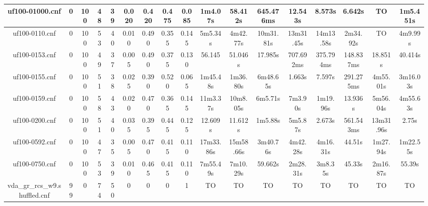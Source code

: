 \documentclass{article}
\begin{document}
\begin{table}[ht!]
\begin{tabular}{|c||c|c|c|c|c|c|c|c||c|c|c|c|c|c|c|c|}
uf100-01000.cnf & 0 & 100 & 48 & 39 & 0.020 & 0.420 & 0.475 & 0.085 & 1m4.07s &
58.412s & 645.476ms & 12.543s & 8.573s & 6.642s & TO & 1m5.451s \\\hline
uf100-0110.cnf & 0 & 100 & 53 & 40 & 0.010 & 0.490 & 0.355 & 0.145 & 5m5.34s &
4m42.77s & 10m31.81s & 13m31.45s & 14m13.58s & 2m34.92s & TO & 4m9.99s \\\hline
uf100-0153.cnf & 0 & 100 & 49 & 37 & 0.005 & 0.490 & 0.375 & 0.130 & 56.145 & 51.046s & 17.985s & 707.692ms & 375.794ms & 148.837ms & 18.851s & 40.414s \\\hline
uf100-0155.cnf & 0 & 100 & 51 & 38 & 0.025 & 0.390 & 0.520 & 0.065 & 1m45.48s & 1m36.80s & 6m48.65s & 1.663s & 7.597s & 291.275ms & 4m55.01s & 3m16.03s \\\hline
uf100-0159.cnf & 0 & 100 & 58 & 43 & 0.020 & 0.470 & 0.365 & 0.145 & 11m3.37s & 10m8.05s & 6m5.71s & 7m3.90s & 1m19.96s & 13.936s & 5m56.04s & 4m55.63s \\\hline
uf100-0200.cnf & 0 & 100 & 51 & 40 & 0.035 & 0.395 & 0.445 & 0.125 & 12.609s & 11.612s & 1m5.88s & 5m5.87s & 2.673s & 561.543ms & 13m31.96s & 2.75s \\\hline
uf100-0592.cnf & 0 & 100 & 47 & 35 & 0.005 & 0.470 & 0.415 & 0.110 & 17m33.86s & 15m58.66s & 3m40.76s & 4m42.28s & 4m16.31s & 44.51s & 1m27.94s & 1m22.55s \\\hline
uf100-0750.cnf & 0 & 100 & 53 & 39 & 0.010 & 0.465 & 0.415 & 0.110 & 7m55.49s & 7m10.29s & 59.662s & 2m28.31s & 3m8.35s & 45.33s & 2m16.87s & 55.39s \\\hline
vda\_gr\_rcs\_w9.shuffled.cnf & 99 & 0 & 74 & 50 & 0 & 0 & 0 & 1& TO & TO & TO & TO & TO & TO & TO & TO  \\\hline
\end{tabular}
\end{table}
\end{document}
